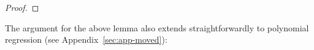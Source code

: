 \begin{proof}


\end{proof}


The argument for the above lemma also extends straightforwardly to polynomial regression (see Appendix~\ref{sec:app-moved}):





